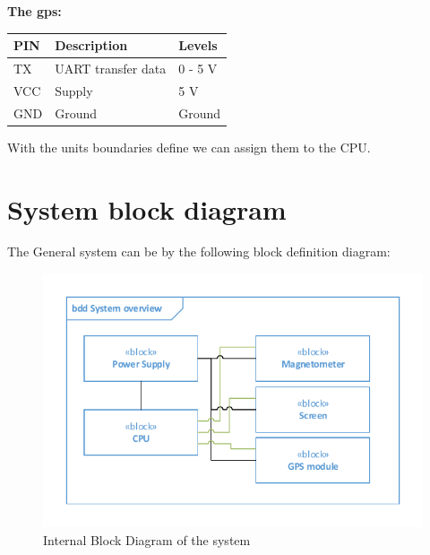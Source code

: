 \textbf{The gps:}\\
\begin{table}[H]
\centering
    \begin{tabular}{|l|l|l|}
    \hline
    PIN & Description    & Levels  \\ \hline
    TX & UART transfer data  & 0 - 5 V \\ \hline
    VCC & Supply         & 5 V     \\ \hline
    GND & Ground         & Ground  \\ \hline
    \end{tabular}
\end{table}

With the units boundaries define we can assign them to the CPU.\\

\section{System block diagram}
The General system can be by the following block definition diagram:\\
\begin{figure}[H]
	\centering
	\includegraphics[width=.8\textwidth]{billeder/SystemBDD}
	\caption{Internal Block Diagram of the system}
	\label{bdd:system}
\end{figure}


